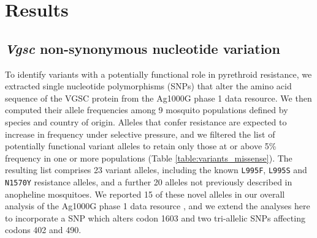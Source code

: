 \documentclass[a4paper,11pt,abstracton,hidelinks]{scrartcl}
\begin{document}
\section*{Results}


\subsection*{\textit{Vgsc} non-synonymous nucleotide variation}


%
To identify variants with a potentially functional role in pyrethroid resistance, we extracted single nucleotide polymorphisms (SNPs) that alter the amino acid sequence of the VGSC protein from the Ag1000G phase 1 data resource.
%
We then computed their allele frequencies among 9 mosquito populations defined by species and country of origin.
%
Alleles that confer resistance are expected to increase in frequency under selective pressure, and we filtered the list of potentially functional variant alleles to retain only those at or above 5\% frequency in one or more populations (Table \ref{table:variants_missense}).
%
The resulting list comprises 23 variant alleles, including the known \texttt{L995F}, \texttt{L995S} and \texttt{N1570Y} resistance alleles, and a further 20 alleles not previously described in anopheline mosquitoes.
%
We reported 15 of these novel alleles in our overall analysis of the Ag1000G phase 1 data resource \cite{Ag1000gConsortium2017}, and we extend the analyses here to incorporate a SNP which alters codon 1603 and two tri-allelic SNPs affecting codons 402 and 490.
\end{document}
